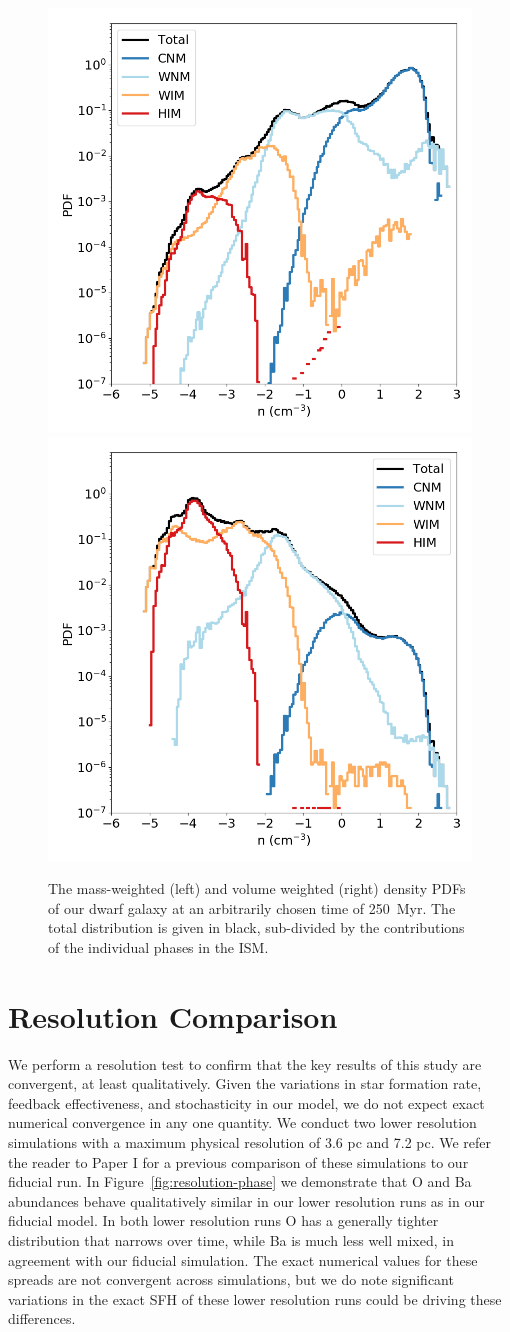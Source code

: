 \begin{figure}
\centering
\includegraphics[width=0.475\linewidth]{figures/ch3/density_PDF}
\includegraphics[width=0.475\linewidth]{figures/ch3/density_PDF_volume_weighted}\caption{The mass-weighted (left) and volume weighted (right) density PDFs of our dwarf galaxy at an arbitrarily chosen time of 250~Myr. The total distribution is given in black, sub-divided by the contributions of the individual phases in the ISM.}
\label{fig:density_pdf}
\end{figure}

\section{Resolution Comparison}
We perform a resolution test to confirm that the key results of this study are convergent, at least qualitatively. Given the variations in star formation rate, feedback effectiveness, and stochasticity in our model, we do not expect exact numerical convergence in any one quantity. We conduct two lower resolution simulations with a maximum physical resolution of 3.6 pc and 7.2 pc. We refer the reader to Paper I for a previous comparison of these simulations to our fiducial run. In Figure~\ref{fig:resolution-phase} we demonstrate that O and Ba abundances behave qualitatively similar in our lower resolution runs as in our fiducial model. In both lower resolution runs O has a generally tighter distribution that narrows over time, while Ba is much less well mixed, in agreement with our fiducial simulation. The exact numerical values for these spreads are not convergent across simulations, but we do note significant variations in the exact SFH of these lower resolution runs could be driving these differences.


